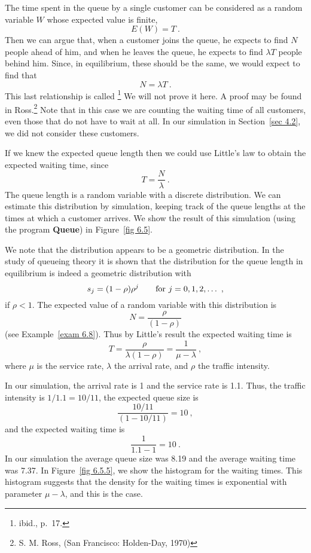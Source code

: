 {\begin{example}
The time spent in the queue by a single customer can be considered as a random
variable $W$ whose expected value is finite,
$$ E(W) = T\ .
$$ Then we can argue that, when a customer joins the queue, he expects to find $N$
people ahead of him, and when he leaves the queue, he expects to find $\lambda T$
people behind him.  Since, in equilibrium, these should be the same, we would expect
to find that
$$ N = \lambda T\ .
$$ This last relationship is called  \footnote{ibid., p.~17.}  We will not prove it here.  A proof may be found in
Ross.\footnote{S. M. Ross,   (San Francisco: Holden-Day, 1970)}  Note that in this case we are counting the
waiting time of all customers, even those that do not have to wait at all.  In our simulation in
Section~\ref{sec 4.2}, we did not consider these customers.
\par If we knew the expected queue length then we could use Little's law to obtain
the expected waiting time, since
$$ T = \frac N\lambda\ .
$$ The queue length is a random variable with a discrete distribution.  We can estimate
this distribution by simulation, keeping track of the queue lengths at the times at
which a customer arrives.  We show the result of this simulation (using the program {\bf
Queue}) in Figure~\ref{fig 6.5}.
\par We note that the distribution appears to be a geometric distribution.  In the study
of queueing theory it is shown that the distribution for the queue length in equilibrium
is indeed a geometric distribution with
$$ s_j = (1 - \rho) \rho^j \qquad {\rm for}\  j = 0, 1, 2, \dots\ ,
$$ if $\rho < 1$.
The expected value of a random variable with this distribution is
$$ N = \frac \rho{(1 - \rho)}
$$ (see Example~\ref{exam 6.8}).  Thus by Little's result the expected waiting time is
$$ T = \frac \rho{\lambda(1 - \rho)} = \frac 1{\mu - \lambda}\ ,
$$ where $\mu$ is the service rate, $\lambda$ the arrival rate, and $\rho$ the
traffic intensity.
\par 
In our simulation, the arrival rate is 1 and the service rate is 1.1.  Thus, the
traffic intensity is $1/1.1 = 10/11$, the expected queue size is
$$
\frac {10/11}{(1 - 10/11)} = 10\ ,
$$ and the expected waiting time is
$$
\frac 1{1.1 - 1} = 10\ .
$$ In our simulation the average queue size was 8.19 and the average waiting time
was 7.37.   In Figure~\ref{fig 6.5.5}, we show the histogram for the waiting times.  
This histogram suggests that the density for the waiting times is exponential with
parameter
$\mu - \lambda$, and this is the case.
\end{example}

}
